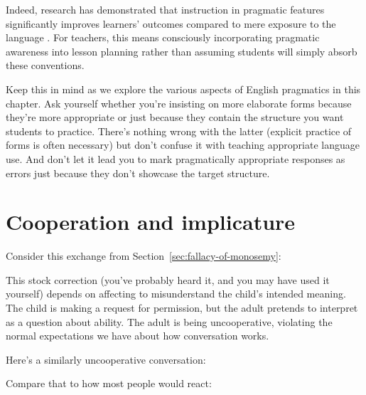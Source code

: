 Indeed, research has demonstrated that instruction in pragmatic features significantly improves learners' outcomes compared to mere exposure to the language \autocite{JeonKaya2006, RenLiLu2022}. For teachers, this means consciously incorporating pragmatic awareness into lesson planning rather than assuming students will simply absorb these conventions.

Keep this in mind as we explore the various aspects of English pragmatics in this chapter. Ask yourself whether you're insisting on more elaborate forms because they're more appropriate or just because they contain the structure you want students to practice. There's nothing wrong with the latter (explicit practice of forms is often necessary) but don't confuse it with teaching appropriate language use. And don't let it lead you to mark pragmatically appropriate responses as errors just because they don't showcase the target structure.

\section{Cooperation and implicature}\label{sec:implicature}

Consider this exchange from Section~\ref{sec:fallacy-of-monosemy}:

\begin{dialogue}
\item[Child] 
\item[Adult] 
\end{dialogue}

This stock correction (you've probably heard it, and you may have used it yourself) depends on affecting to misunderstand the child's intended meaning. The child is making a request for permission, but the adult pretends to interpret  as a question about ability. The adult is being uncooperative, violating the normal expectations we have about how conversation works.

Here's a similarly uncooperative conversation:

\begin{dialogue}
\item[A] 
\item[B] 
\end{dialogue}
Compare that to how most people would react:

